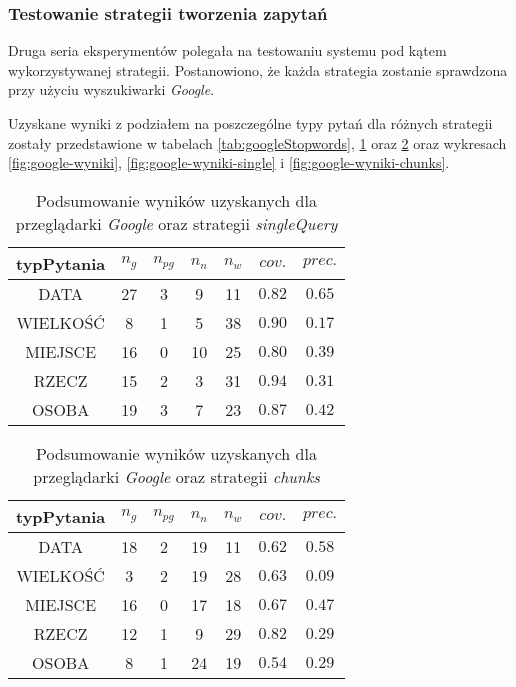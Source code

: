 \subsubsection{Testowanie strategii tworzenia zapytań}
Druga seria eksperymentów polegała na testowaniu systemu pod kątem wykorzystywanej strategii. Postanowiono, że każda strategia zostanie sprawdzona przy użyciu wyszukiwarki \textit{Google}. 

Uzyskane wyniki z podziałem na poszczególne typy pytań dla różnych strategii zostały przedstawione w tabelach \ref{tab:googleStopwords}, \ref{tab:GoogleSingle} oraz \ref{tab:GoogleChunks} oraz wykresach \ref{fig:google-wyniki}, \ref{fig:google-wyniki-single} i \ref{fig:google-wyniki-chunks}.

\begin{table}[h]
	\centering
	\begin{tabular}{|c|c|c|c|c|c|c| }
		
		\hline
		\textbf{typPytania} & $n_g$ &$n_{pg}$&$n_n$&$n_w$&$cov.$&$prec.$  \\ \hline
		DATA&27&3&9&11&$\num{0.82}$&$\num{0.65}$ \\ \hline
		WIELKOŚĆ&8&1&5&38&$\num{0.90}$&$\num{0.17}$ \\ \hline
		MIEJSCE&16&0&10&25&$\num{0.80}$&$\num{0.39}$ \\ \hline
		RZECZ&15&2&3&31&$\num{0.94}$&$\num{0.31}$\\ \hline
		OSOBA&19&3&7&23&$\num{0.87}$&$\num{0.42}$\\ \hline
	\end{tabular}
	\caption{Podsumowanie wyników uzyskanych dla przeglądarki \textit{Google} oraz strategii \textit{singleQuery}}
	
	\label{tab:GoogleSingle}
	
\end{table}

\begin{table}[h]
	\centering
	\begin{tabular}{|c|c|c|c|c|c|c| }
		
		\hline
		\textbf{typPytania} & $n_g$ &$n_{pg}$&$n_n$&$n_w$&$cov.$&$prec.$  \\ \hline
		DATA&18&2&19&11&$\num{0.62}$&$\num{0.58}$ \\ \hline
		WIELKOŚĆ&3&2&19&28&$\num{0.63}$&$\num{0.09}$ \\ \hline
		MIEJSCE&16&0&17&18&$\num{0.67}$&$\num{0.47}$ \\ \hline
		RZECZ&12&1&9&29&$\num{0.82}$&$\num{0.29}$\\ \hline
		OSOBA&8&1&24&19&$\num{0.54}$&$\num{0.29}$\\ \hline
	\end{tabular}
	\caption{Podsumowanie wyników uzyskanych dla przeglądarki \textit{Google} oraz strategii \textit{chunks}}
	
	\label{tab:GoogleChunks}
	
\end{table}

